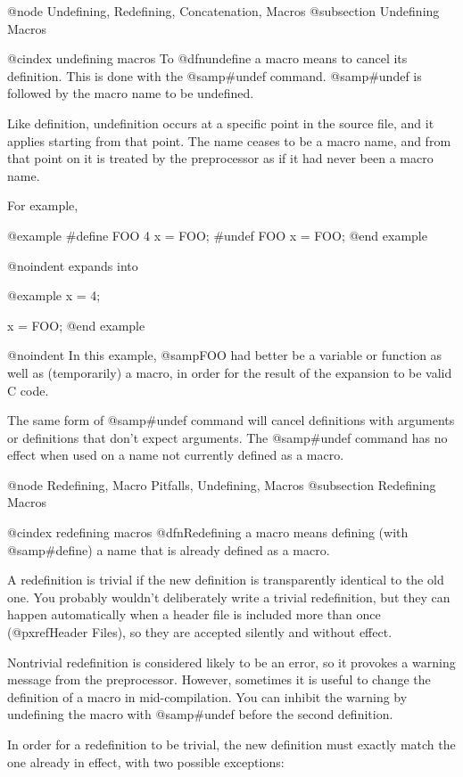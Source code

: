 {@node Undefining, Redefining, Concatenation, Macros
@subsection Undefining Macros

@cindex undefining macros
To @dfn{undefine} a macro means to cancel its definition.  This is done
with the @samp{#undef} command.  @samp{#undef} is followed by the macro
name to be undefined.

Like definition, undefinition occurs at a specific point in the source
file, and it applies starting from that point.  The name ceases to be a
macro name, and from that point on it is treated by the preprocessor as if
it had never been a macro name.

For example,

@example
#define FOO 4
x = FOO;
#undef FOO
x = FOO;
@end example

@noindent
expands into

@example
x = 4;

x = FOO;
@end example

@noindent
In this example, @samp{FOO} had better be a variable or function as well
as (temporarily) a macro, in order for the result of the expansion to be
valid C code.

The same form of @samp{#undef} command will cancel definitions with
arguments or definitions that don't expect arguments.  The @samp{#undef}
command has no effect when used on a name not currently defined as a macro.

@node Redefining, Macro Pitfalls, Undefining, Macros
@subsection Redefining Macros

@cindex redefining macros
@dfn{Redefining} a macro means defining (with @samp{#define}) a name that
is already defined as a macro.

A redefinition is trivial if the new definition is transparently identical
to the old one.  You probably wouldn't deliberately write a trivial
redefinition, but they can happen automatically when a header file is
included more than once (@pxref{Header Files}), so they are accepted
silently and without effect.

Nontrivial redefinition is considered likely to be an error, so
it provokes a warning message from the preprocessor.  However, sometimes it
is useful to change the definition of a macro in mid-compilation.  You can
inhibit the warning by undefining the macro with @samp{#undef} before the
second definition.

In order for a redefinition to be trivial, the new definition must
exactly match the one already in effect, with two possible exceptions:

}
